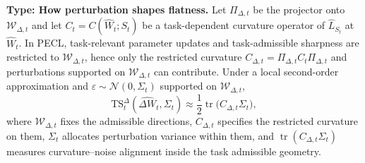\documentclass{article}
\theoremstyle{plain}
\theoremstyle{definition}
\theoremstyle{remark}
\begin{document}
\noindent\textbf{Type: How perturbation shapes flatness.}\quad
Let $\Pi_{\Delta,t}$ be the projector onto $\mathcal W_{\Delta,t}$ and let $C_t=C(\hat W_t;S_t)$ be a task-dependent curvature operator of $\hat L_{S_t}$ at $\hat W_t$.
In PECL, task-relevant parameter updates and task-admissible sharpness are restricted to $\mathcal W_{\Delta,t}$, hence only the restricted curvature $C_{\Delta,t}=\Pi_{\Delta,t}C_t\Pi_{\Delta,t}$ and perturbations supported on $\mathcal W_{\Delta,t}$ can contribute. 
Under a local second-order approximation and $\varepsilon\sim\mathcal N(0,\Sigma_t)$ supported on $\mathcal W_{\Delta,t}$,
{%
\setlength{\abovedisplayskip}{4pt}
\setlength{\belowdisplayskip}{3pt}
\setlength{\abovedisplayshortskip}{4pt}
\setlength{\belowdisplayshortskip}{3pt}
\[
\mathrm{TS}_t^{\Delta}(\hat{\Delta W}_t,\Sigma_t)
\approx
\frac12\operatorname{tr}\!\big(C_{\Delta,t}\Sigma_t\big),
\]
}where $\mathcal W_{\Delta,t}$ fixes the admissible directions, $C_{\Delta,t}$ specifies the restricted curvature on them, $\Sigma_t$ allocates perturbation variance within them, and $\operatorname{tr}(C_{\Delta,t}\Sigma_t)$ measures curvature–noise alignment inside the task admissible geometry.

\end{document}
